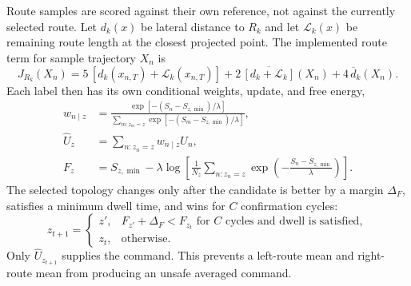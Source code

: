 \documentclass[11pt,a4paper]{article}
\begin{document}
Route samples are scored against their own reference, not against the
currently selected route. Let $d_k(x)$ be lateral distance to $R_k$ and let
$\mathcal L_k(x)$ be remaining route length at the closest projected point.
The implemented route term for sample trajectory $X_n$ is
\begin{equation}
 J_{R_k}(X_n)=
 5\,[d_k(x_{n,T})+\mathcal L_k(x_{n,T})]
 +2\,\overline{[d_k+\mathcal L_k]}(X_n)
 +4\,\overline d_k(X_n).
 \label{eq:route-conditioned-cost}
\end{equation}
Each label then has its own conditional weights, update, and free energy,
\begin{align}
 w_{n\mid z}
 &=\frac{\exp[-(S_n-S_{z,\min})/\lambda]}
         {\sum_{m:z_m=z}\exp[-(S_m-S_{z,\min})/\lambda]},\\
 \widehat U_z&=\sum_{n:z_n=z}w_{n\mid z}U_n,\\
 F_z&=S_{z,\min}
 -\lambda\log\!\left[
   \frac{1}{N_z}\sum_{n:z_n=z}
   \exp\!\left(-\frac{S_n-S_{z,\min}}{\lambda}\right)
 \right].
 \label{eq:parallel-route-free-energy}
\end{align}
The selected topology changes only after the candidate is better by a margin
$\Delta_F$, satisfies a minimum dwell time, and wins for $C$ confirmation
cycles:
\begin{equation}
 z_{t+1}=
 \begin{cases}
 z', & F_{z'}+\Delta_F<F_{z_t}
       \text{ for $C$ cycles and dwell is satisfied},\\
 z_t, & \text{otherwise}.
 \end{cases}
 \label{eq:topology-hysteresis}
\end{equation}
Only $\widehat U_{z_{t+1}}$ supplies the command. This prevents a left-route
mean and right-route mean from producing an unsafe averaged command.
\end{document}
